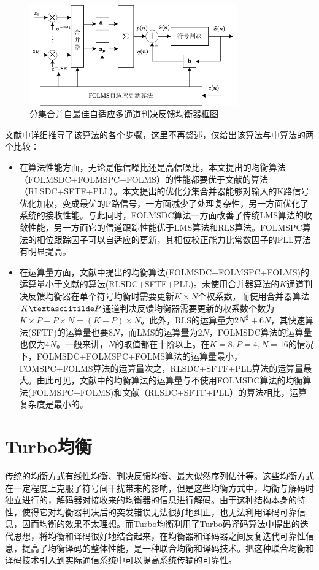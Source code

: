 \begin{figure}[htb]
  \begin{center}
    \includegraphics[width=0.8\textwidth]{images/adaptiveDFE.pdf}
  \end{center}
  \caption{分集合并自最佳自适应多通道判决反馈均衡器框图}
  \label{fig:2.3}
\end{figure}

文献中详细推导了该算法的各个步骤，这里不再赘述，仅给出该算法与中算法的两个比较：
\begin{itemize}
    \item
        在算法性能方面，无论是低信噪比还是高信噪比，本文提出的均衡算法（FOLMSDC+FOLMSPC+FOLMS）的性能都要优于文献的算法（RLSDC+SFTF+PLL）。本文提出的优化分集合并器能够对输入的K路信号优化加权，变成最优的P路信号，一方面减少了处理复杂性，另一方面优化了系统的接收性能。与此同时，FOLMSDC算法一方面改善了传统LMS算法的收敛性能，另一方面它的信道跟踪性能优于LMS算法和RLS算法。FOLMSPC算法的相位跟踪因子可以自适应的更新，其相位校正能力比常数因子的PLL算法有明显提高。
    \item
        在运算量方面，文献中提出的均衡算法(FOLMSDC+FOLMSPC+FOLMS)的运算量小于文献的算法(RLSDC+SFTF+PLL)。未使用合并器算法的$K$通道判决反馈均衡器在单个符号均衡时需要更新$K\times
        N$个权系数，而使用合并器算法$K\textasciitilde
        P$通道判决反馈均衡器需要更新的权系数个数为$K\times P+P\times
        N=(K+P)\times
        N$。此外，RLS的运算量为$2N^2+6N$，其快速算法(SFTF)的运算量也要$8N$，而LMS的运算量为$2N$，FOLMSDC算法的运算量也仅为$4N$。一般来讲，$N$的取值都在十阶以上。在$K=8,P=4,N=16$的情况下，FOLMSDC+FOLMSPC+FOLMS算法的运算量最小，FOMSPC+FOLMS算法的运算量次之，RLSDC+SFTF+PLL算法的运算量最大。由此可见，文献中的均衡算法的运算量与不使用FOLMSDC算法的均衡算法(FOLMSPC+FOLMS)和文献（RLSDC+SFTF+PLL）的算法相比，运算复杂度是最小的。
\end{itemize}
\section{Turbo均衡}
传统的均衡方式有线性均衡、判决反馈均衡、最大似然序列估计等。这些均衡方式在一定程度上克服了符号间干扰带来的影响，但是这些均衡方式中，均衡与解码时独立进行的，解码器对接收来的均衡器的信息进行解码。由于这种结构本身的特性，使得它对均衡器判决后的突发错误无法很好地纠正，也无法利用译码可靠信息，因而均衡的效果不太理想。而Turbo均衡利用了Turbo码译码算法中提出的迭代思想，将均衡和译码很好地结合起来，在均衡器和译码器之间反复迭代可靠性信息，提高了均衡译码的整体性能，是一种联合均衡和译码技术。把这种联合均衡和译码技术引入到实际通信系统中可以提高系统传输的可靠性。
